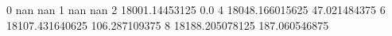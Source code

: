 0 nan nan
1 nan nan
2 18001.14453125 0.0
4 18048.166015625 47.021484375
6 18107.431640625 106.287109375
8 18188.205078125 187.060546875
